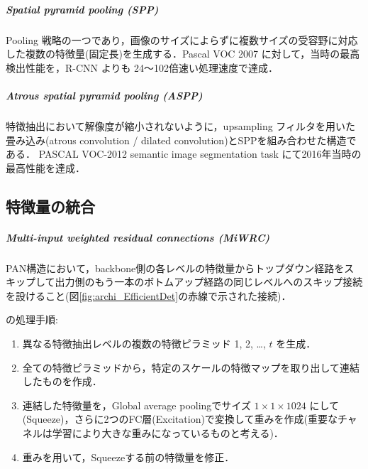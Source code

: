 \documentclass[twocolumn]{jsarticle} %
\begin{document}
\subparagraph{Spatial pyramid pooling (SPP) \cite{HZRS15,HZRS14}} Pooling 戦略の一つであり，画像のサイズによらずに複数サイズの受容野に対応した複数の特徴量(固定長)を生成する．Pascal VOC 2007 に対して，当時の最高検出性能を，R-CNN よりも 24〜102倍速い処理速度で達成．

\subparagraph{Atrous spatial pyramid pooling (ASPP) \cite{CPKMY17}} 特徴抽出において解像度が縮小されないように，upsampling フィルタを用いた畳み込み(atrous convolution / dilated convolution)とSPPを組み合わせた構造である．
PASCAL VOC-2012 semantic image segmentation task にて2016年当時の最高性能を達成．

\subsection{特徴量の統合}
\subparagraph{Multi-input weighted residual connections (MiWRC)\cite{TPL20}} PAN構造において，backbone側の各レベルの特徴量からトップダウン経路をスキップして出力側のもう一本のボトムアップ経路の同じレベルへのスキップ接続を設けること(図\ref{fig:archi_EfficientDet}の赤線で示された接続)．

 \cite{ZSWTCCL19} の処理手順:
\begin{enumerate}
    \item 異なる特徴抽出レベルの複数の特徴ピラミッド 1, 2, …, $t$ を生成．
    \item 全ての特徴ピラミッドから，特定のスケールの特徴マップを取り出して連結したものを作成．
    \item 連結した特徴量を，Global average poolingでサイズ $1{\times}1{\times}1024$ にして(Squeeze)，さらに2つのFC層(Excitation)で変換して重みを作成(重要なチャネルは学習により大きな重みになっているものと考える)．
    \item 重みを用いて，Squeezeする前の特徴量を修正．
\end{enumerate}
\end{document}
